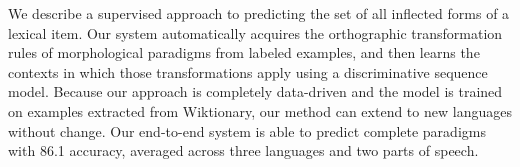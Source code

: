 We describe a supervised approach to predicting the set of all inflected forms of a lexical item. Our system automatically acquires the orthographic
 transformation rules of morphological paradigms from labeled examples, and then
 learns the contexts in which those transformations apply using a discriminative
 sequence model. Because our approach is completely data-driven and the model is
 trained on examples extracted from Wiktionary, our method can extend to new
 languages without change. Our end-to-end system is able to predict complete
 paradigms with 86.1%
 accuracy, averaged across three languages and two parts of speech.

